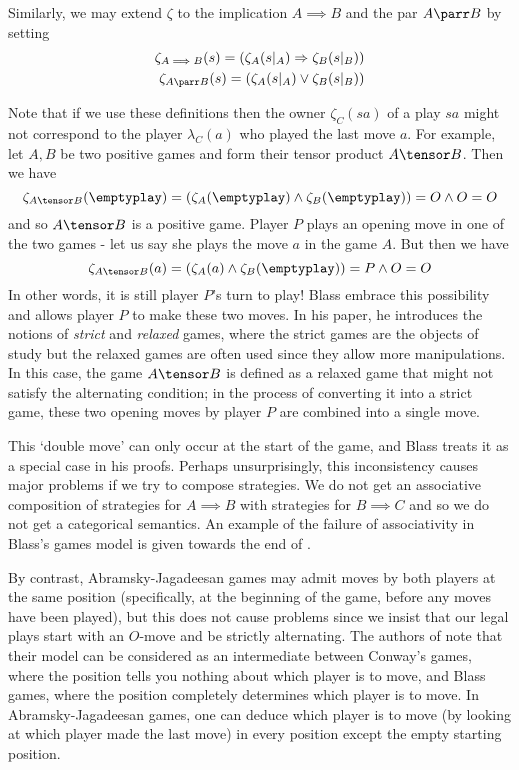 \documentclass[11pt]{article} %
\begin{document}
Similarly, we may extend $\zeta$ to the implication $A\implies B$ and the par $A\parr B$ by setting
\begin{align*}
  \zeta_{A\implies B}(s)=(\zeta_A(s\vert_A)\Rightarrow \zeta_B(s\vert_B))\\
  \zeta_{A\parr B}(s) = (\zeta_A(s\vert_A) \vee \zeta_B(s\vert_B))
\end{align*}

Note that if we use these definitions then the owner $\zeta_C(sa)$ of a play $sa$ might not correspond to the player $\lambda_C(a)$ who played the last move $a$.  For example, let $A,B$ be two positive games and form their tensor product $A\tensor B$.  Then we have
\[
  \zeta_{A\tensor B}(\emptyplay) = (\zeta_A(\emptyplay) \wedge \zeta_B(\emptyplay)) = O \wedge O = O
  \]
and so $A\tensor B$ is a positive game.  Player $P$ plays an opening move in one of the two games - let us say she plays the move $a$ in the game $A$.  But then we have
\[
  \zeta_{A\tensor B}(a) = (\zeta_A(a) \wedge \zeta_B(\emptyplay)) = P \wedge O = O
  \]
In other words, it is still player $P$'s turn to play!  Blass embrace this possibility and allows player $P$ to make these two moves.  In his paper, he introduces the notions of \emph{strict} and \emph{relaxed} games, where the strict games are the objects of study but the relaxed games are often used since they allow more manipulations.  In this case, the game $A\tensor B$ is defined as a relaxed game that might not satisfy the alternating condition; in the process of converting it into a strict game, these two opening moves by player $P$ are combined into a single move.

This `double move' can only occur at the start of the game, and Blass treats it as a special case in his proofs.  Perhaps unsurprisingly, this inconsistency causes major problems if we try to compose strategies.  We do not get an associative composition of strategies for $A\implies B$ with strategies for $B\implies C$ and so we do not get a categorical semantics.  An example of the failure of associativity in Blass's games model is given towards the end of \cite{abramskyjagadeesangames}.

By contrast, Abramsky-Jagadeesan games may admit moves by both players at the same position (specifically, at the beginning of the game, before any moves have been played), but this does not cause problems since we insist that our legal plays start with an $O$-move and be strictly alternating.  The authors of \cite{abramskyjagadeesangames} note that their model can be considered as an intermediate between Conway's games, where the position tells you nothing about which player is to move, and Blass games, where the position completely determines which player is to move.  In Abramsky-Jagadeesan games, one can deduce which player is to move (by looking at which player made the last move) in every position except the empty starting position.
\end{document}
